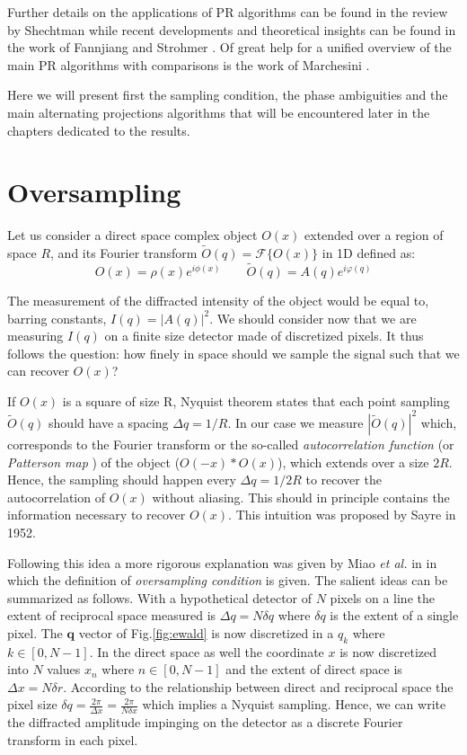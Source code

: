 Further details on the applications of PR algorithms 
can be found in the review by Shechtman \cite{Miao_2015ReviewPhaseRetrieval} while recent developments and theoretical 
insights can be found in the work of Fannjiang and Strohmer \cite{Fannjiang2020}. Of great help for a unified overview 
of the main PR algorithms with comparisons is the work of Marchesini \cite{marchesini_unified_2007}.

Here we will present first the sampling condition, the phase ambiguities and the main alternating projections algorithms 
that will be encountered later in the chapters dedicated to the results. 

\section{Oversampling}\label{sec:oversampling}

Let us consider a direct space complex object $O(x) $ extended over a region of space $R$, and its Fourier transform 
$ \widetilde{O}(q) =\mathcal{F}\{ O(x)\}$ in 1D defined as: 
\begin{equation}
    O(x) = \rho(x)e^{i\phi(x)} \qquad \widetilde{O}(q) = A(q)e^{i\varphi(q)}
\end{equation}

The measurement of the diffracted intensity of the object would be equal to, barring constants, $I(q) = |A(q)|^2$. 
We should consider now that we are measuring $I(q)$ on a finite size detector made of discretized pixels. It thus 
follows the question: how finely in space should we sample the signal such that we can recover $O(x)$? 

If $O(x) $ is a square of size R, Nyquist theorem states that each point sampling $ \widetilde{O}(q)$ should have a 
spacing $ \Delta q = 1/R$. In our case we measure $|\widetilde{O}(q)|^2$ which, corresponds to the Fourier transform or the 
so-called \textit{autocorrelation function} (or \textit{Patterson map} \cite{Patterson1937}) of the object ($O(-x)\ast O(x)$), 
which extends over a size $2R$. Hence, the sampling should 
happen every $ \Delta q = 1/2R$ to recover the autocorrelation of $O(x) $ without aliasing. This should in principle 
contains the information necessary to recover $O(x) $. This intuition was proposed by Sayre in 1952.

Following this idea a more rigorous explanation was given by Miao \textit{et al.} in \cite{Miao1998} in which the 
definition of \textit{oversampling condition} is given. The salient ideas can be summarized as follows. 
With a hypothetical detector of $N$ pixels on a line the extent of reciprocal space measured is $\Delta q = N\delta q$ 
where $\delta q$ is the extent of a single pixel. The $\mathbf{q}$ vector of Fig.\ref{fig:ewald} is now discretized in 
a $q_k$ where $k \in [0,N-1]$. In the direct space as well the coordinate $x$ is now discretized into $N$ values 
$x_n$ where $n \in [0,N-1]$ and the extent of direct space is $\Delta x = N\delta r$. According to the relationship 
between direct and reciprocal space the pixel size $\delta q = \frac{2\pi}{\Delta x} = \frac{2\pi}{N \delta x}$ which 
implies a Nyquist sampling.
Hence, we can write the diffracted amplitude impinging on the detector as a discrete Fourier transform in each pixel. 

